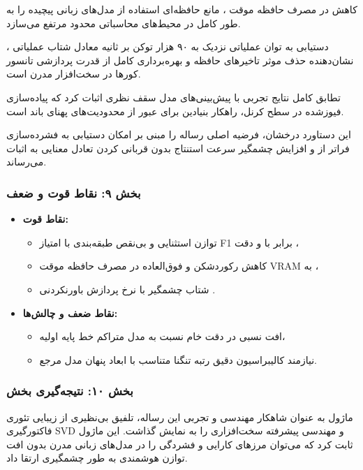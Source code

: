 کاهش  در مصرف حافظه موقت ، مانع حافظه‌ای استفاده از مدل‌های زبانی پیچیده را به طور کامل در محیط‌های محاسباتی محدود مرتفع می‌سازد.

دستیابی به توان عملیاتی نزدیک به ۹۰ هزار توکن بر ثانیه  معادل شتاب عملیاتی ، نشان‌دهنده حذف موثر تاخیرهای حافظه و بهره‌برداری کامل از قدرت پردازشی تانسور کورها در سخت‌افزار مدرن است.

تطابق کامل نتایج تجربی با پیش‌بینی‌های مدل سقف نظری اثبات کرد که پیاده‌سازی فیوزشده در سطح کرنل، راهکار بنیادین برای عبور از محدودیت‌های پهنای باند است.

این دستاورد درخشان، فرضیه اصلی رساله را مبنی بر امکان دستیابی به فشرده‌سازی فراتر از  و افزایش چشمگیر سرعت استنتاج بدون قربانی کردن تعادل معنایی به اثبات می‌رساند.

\subsubsection*{بخش ۹: نقاط قوت و ضعف }
\begin{itemize}
    \item \textbf{نقاط قوت:}
    \begin{itemize}
        \item توازن استثنایی و بی‌نقص طبقه‌بندی با امتیاز F1 برابر با  و دقت ،
        \item کاهش رکوردشکن و فوق‌العاده  در مصرف حافظه موقت VRAM به ،
        \item شتاب چشمگیر  با نرخ پردازش باورنکردنی .
    \end{itemize}
    \item \textbf{نقاط ضعف و چالش‌ها:}
    \begin{itemize}
        \item افت نسبی  در دقت خام نسبت به مدل متراکم خط پایه اولیه،
        \item نیازمند کالیبراسیون دقیق رتبه تنگنا متناسب با ابعاد پنهان مدل مرجع.
    \end{itemize}
\end{itemize}

\subsubsection*{بخش ۱۰: نتیجه‌گیری بخش }
ماژول  به عنوان شاهکار مهندسی و تجربی این رساله، تلفیق بی‌نظیری از زیبایی تئوری فاکتورگیری SVD و مهندسی پیشرفته سخت‌افزاری را به نمایش گذاشت. این ماژول ثابت کرد که می‌توان مرزهای کارایی و فشردگی را در مدل‌های زبانی مدرن بدون افت توازن هوشمندی به طور چشمگیری ارتقا داد.

